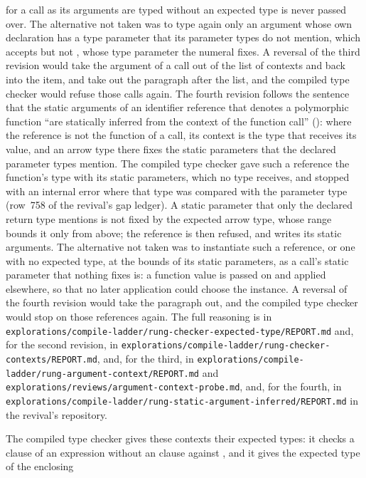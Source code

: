 \begin{description}
for a call as its arguments are typed without an expected type is never passed
over.
The alternative not taken was to type again only an argument whose own
declaration has a type parameter that its parameter types do not mention, which
accepts  but not ,
whose type parameter the numeral fixes.
A reversal of the third revision would take the argument of a call out of the
list of contexts and back into the item, and take out the paragraph after the
list, and the compiled type checker would refuse those calls again.
The fourth revision follows the sentence that the static arguments of an
identifier reference that denotes a polymorphic function ``are statically
inferred from the context of the function call'' (): where
the reference is not the function of a call, its context is the type that
receives its value, and an arrow type there fixes the static parameters that
the declared parameter types mention.
The compiled type checker gave such a reference the function's type with its
static parameters, which no type receives, and stopped with an internal error
where that type was compared with the parameter type (row~758 of the revival's
gap ledger).
A static parameter that only the declared return type mentions is not fixed
by the expected arrow type, whose range bounds it only from above; the
reference is then refused, and writes its static arguments.
The alternative not taken was to instantiate such a reference, or one with no
expected type, at the bounds of its static parameters, as a call's static
parameter that nothing fixes is: a function value is passed on and applied
elsewhere, so that no later application could choose the instance.
A reversal of the fourth revision would take the paragraph out, and the
compiled type checker would stop on those references again.
The full reasoning is in
\nolinkurl{explorations/compile-ladder/rung-checker-expected-type/REPORT.md}
and, for the second revision, in
\nolinkurl{explorations/compile-ladder/rung-checker-contexts/REPORT.md},
and, for the third, in
\nolinkurl{explorations/compile-ladder/rung-argument-context/REPORT.md} and
\nolinkurl{explorations/reviews/argument-context-probe.md},
and, for the fourth, in
\nolinkurl{explorations/compile-ladder/rung-static-argument-inferred/REPORT.md}
in the revival's repository.
\item[Effect] The compiled type checker gives these contexts their expected
types: it checks a clause of an  expression without an 
clause against \TYP{()}, and it gives the expected type of the enclosing

\end{description}
